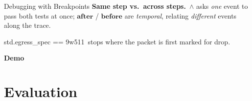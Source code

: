 \begin{frame}{Debugging with Breakpoints}
  \vspace{0.1em}
  \footnotesize
  \textbf{Same step vs.\ across steps.}\ $\land$ asks \emph{one} event to pass
  both tests at once; $\mathbf{after}$ / $\mathbf{before}$ are \emph{temporal},
  relating \emph{different} events along the trace.

  \vspace{0.2em}
  {\scriptsize\ttfamily std.egress\_spec == 9w511}\ {\scriptsize\textcolor{palGray}{stops where the packet is first marked for drop.}}
\end{frame}

{
\begin{frame}[plain]
  \centering
  \vfill
  {\Huge\textbf{Demo}}
  \vfill
\end{frame}
}



\section{Evaluation}

